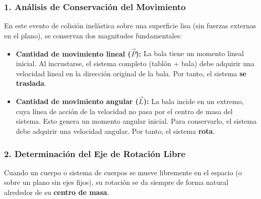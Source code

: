 \documentclass[12pt, a4paper]{article}
\begin{document}
\subsubsection*{1. Análisis de Conservación del Movimiento}
En este evento de colisión inelástica sobre una superficie lisa (sin fuerzas externas en el plano), se conservan dos magnitudes fundamentales:
\begin{itemize}
    \item \textbf{Cantidad de movimiento lineal ($\vec{P}$):} La bala tiene un momento lineal inicial. Al incrustarse, el sistema completo (tablón + bala) debe adquirir una velocidad lineal en la dirección original de la bala. Por tanto, el sistema \textbf{se traslada}.
    \item \textbf{Cantidad de movimiento angular ($\vec{L}$):} La bala incide en un extremo, cuya línea de acción de la velocidad no pasa por el centro de masa del sistema. Esto genera un momento angular inicial. Para conservarlo, el sistema debe adquirir una velocidad angular. Por tanto, el sistema \textbf{rota}.
\end{itemize}

\subsubsection*{2. Determinación del Eje de Rotación Libre}
Cuando un cuerpo o sistema de cuerpos se mueve libremente en el espacio (o sobre un plano sin ejes fijos), su rotación se da siempre de forma natural alrededor de su \textbf{centro de masa}.
\end{document}
